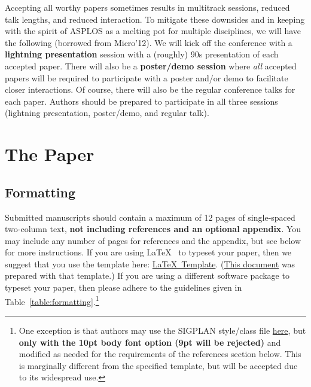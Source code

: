 \documentclass[pageno]{jpaper}
\begin{document}
Accepting all worthy papers sometimes results in multitrack sessions,
reduced talk lengths, and reduced interaction. To mitigate these downsides
and in keeping with the spirit of ASPLOS as a melting pot for multiple
disciplines, we will have the following (borrowed from Micro'12).  We will
kick off the conference with a {\bf lightning presentation} session with a
(roughly) 90s presentation of each accepted paper. There will also be a {\bf
poster/demo session} where {\em all} accepted papers will be required to
participate with a poster and/or demo to facilitate closer interactions. Of
course, there will also be the regular conference talks for each paper.
Authors should be prepared to participate in all three sessions (lightning
presentation, poster/demo, and regular talk).

\section{The Paper}

\subsection{Formatting}

Submitted manuscripts should contain a maximum of 12 pages of single-spaced
two-column text, {\bf not including references and an optional
appendix}. You may include any number of pages for references and the
appendix, but see below for more instructions.  If you are using
\LaTeX~\cite{lamport94} to typeset your paper, then we suggest that you use
the template here:
\href{http://www.cs.utah.edu/asplos14/files/asplos14-latex-template.tar.gz}{\LaTeX~Template}.
(\href{http://www.cs.utah.edu/asplos14/files/asplos14-template.pdf}{This
document} was prepared with that template.)  If you are using a different
software package to typeset your paper, then please adhere to the
guidelines given in Table~\ref{table:formatting}.\footnote{One exception is
that authors may use the SIGPLAN style/class file
\href{http://classic.sigplan.org/sigplanconf.cls}{here}, but {\bf only with
the 10pt body font option (9pt will be rejected)} and modified as needed
for the requirements of the references section below.  This is marginally
different from the specified template, but will be accepted due to its
widespread use.}
\end{document}
